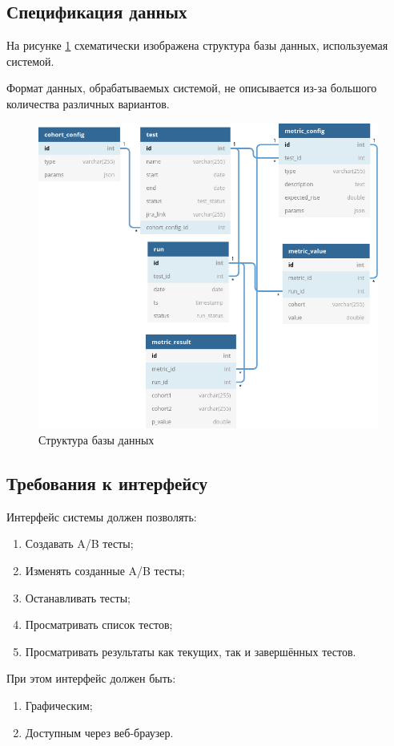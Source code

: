 \documentclass[../document.tex]{subfiles}
\begin{document}
	\subsection{Спецификация данных}
	\par На рисунке \ref{image:db_plot} схематически изображена структура базы данных, используемая системой.
	\par Формат данных, обрабатываемых системой, не описывается из-за большого количества различных вариантов.
	\begin{figure}[h] 
		\includegraphics[width=\linewidth]{A_B v.3.0.png}
		\caption{\label{image:db_plot}Структура базы данных}
	\end{figure}
	\subsection{Требования к интерфейсу}
	\par Интерфейс системы должен позволять:
	\begin{enumerate}
		\item Создавать A/B тесты;
		\item Изменять созданные A/B тесты;
		\item Останавливать тесты;
		\item Просматривать список тестов;
		\item Просматривать результаты как текущих, так и завершённых тестов.
	\end{enumerate}
	\par При этом интерфейс должен быть:
	\begin{enumerate}
		\item Графическим;
		\item Доступным через веб-браузер.
	\end{enumerate}
\end{document}
